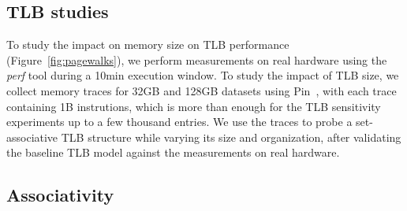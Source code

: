 
\subsection{TLB studies}
To study the impact on memory size on  TLB performance (Figure~\ref{fig:pagewalks}), we perform measurements on real hardware using the \textit{perf} tool during a 10min execution window. To study the impact of TLB size, we collect memory traces for 32GB and 128GB datasets using Pin~\cite{luk:pin}, with each trace containing 1B instrutions, which is more than enough for the TLB sensitivity experiments up to a few thousand entries. We use the traces to probe a set-associative TLB structure while varying its size and organization, after validating the baseline TLB model against the measurements on real hardware. 

\subsection{Associativity}


